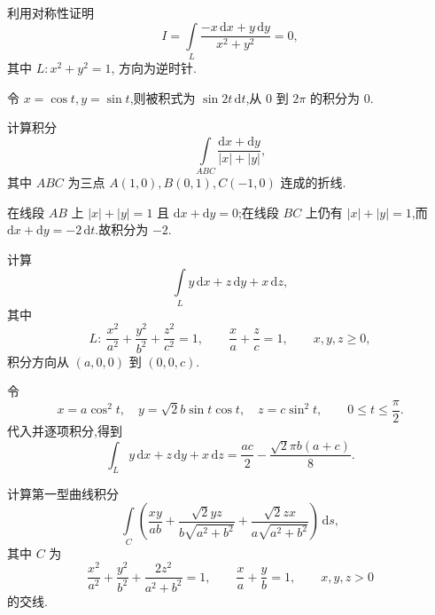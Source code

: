 \begin{example}
    利用对称性证明
    \[
        I=\int\limits_L\dfrac{-x\,\mathrm{d}x+y\,\mathrm{d}y}{x^2+y^2}=0,
    \]
    其中 $L:x^2+y^2=1$, 方向为逆时针.
\end{example}
\exampleblank

\begin{solution}
    令 $x=\cos t,y=\sin t$,则被积式为 $\sin2t\,\mathrm{d}t$,从 $0$ 到 $2\pi$ 的积分为 $0$.
\end{solution}

\begin{example}
    计算积分
    \[
        \displaystyle\int\limits_{ABC}\dfrac{\mathrm{d}x+\mathrm{d}y}{|x|+|y|},
    \]
    其中 $ABC$ 为三点 $A(1,0),B(0,1),C(-1,0)$ 连成的折线.
\end{example}
\exampleblank

\begin{solution}
    在线段 $AB$ 上 $|x|+|y|=1$ 且 $\mathrm{d}x+\mathrm{d}y=0$;在线段 $BC$ 上仍有 $|x|+|y|=1$,而 $\mathrm{d}x+\mathrm{d}y=-2\,\mathrm{d}t$.故积分为 $-2$.
\end{solution}

\begin{example}
    计算
    \[
        \displaystyle\int\limits_L y\,\mathrm{d}x+z\,\mathrm{d}y+x\,\mathrm{d}z,
    \]
    其中
    \[
        L:\ \dfrac{x^2}{a^2}+\dfrac{y^2}{b^2}+\dfrac{z^2}{c^2}=1,
        \qquad \dfrac{x}{a}+\dfrac{z}{c}=1,
        \qquad x,y,z\geq0,
    \]
    积分方向从 $(a,0,0)$ 到 $(0,0,c)$.
\end{example}
\exampleblank

\begin{solution}
    令
    \[
        x=a\cos^2t,\quad y=\sqrt{2}b\sin t\cos t,\quad z=c\sin^2t,\qquad 0\leq t\leq\dfrac{\pi}{2}.
    \]
    代入并逐项积分,得到
    \[
        \displaystyle\int_Ly\,\mathrm{d}x+z\,\mathrm{d}y+x\,\mathrm{d}z
        =\dfrac{ac}{2}-\dfrac{\sqrt{2}\pi b(a+c)}{8}.
    \]
\end{solution}

\begin{example}
    计算第一型曲线积分
    \[
        \displaystyle\int\limits_C\left(
        \dfrac{xy}{ab}+\dfrac{\sqrt{2}yz}{b\sqrt{a^2+b^2}}+
        \dfrac{\sqrt{2}zx}{a\sqrt{a^2+b^2}}
        \right)\,\mathrm{d}s,
    \]
    其中 $C$ 为
    \[
        \dfrac{x^2}{a^2}+\dfrac{y^2}{b^2}+\dfrac{2z^2}{a^2+b^2}=1,
        \qquad \dfrac{x}{a}+\dfrac{y}{b}=1,
        \qquad x,y,z>0
    \]
    的交线.
\end{example}
\exampleblank

